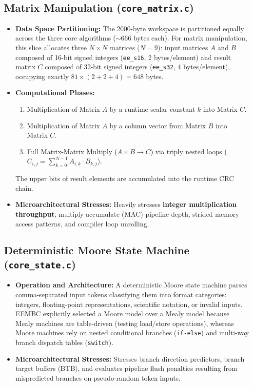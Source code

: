 \documentclass[11pt,a4paper]{article}
\begin{document}
\subsection{Matrix Manipulation (\texttt{core\_matrix.c})}
\begin{itemize}[leftmargin=1.4em]
    \item \textbf{Data Space Partitioning:}
    The 2000-byte workspace is partitioned equally across the three core algorithms (${\sim}666$ bytes each). For matrix manipulation, this slice allocates three $N\times N$ matrices ($N=9$): input matrices $A$ and $B$ composed of 16-bit signed integers (\texttt{ee\_s16}, 2 bytes/element) and result matrix $C$ composed of 32-bit signed integers (\texttt{ee\_s32}, 4 bytes/element), occupying exactly $81 \times (2 + 2 + 4) = 648$ bytes.
    \item \textbf{Computational Phases:}
    \begin{enumerate}
        \item Multiplication of Matrix $A$ by a runtime scalar constant $k$ into Matrix $C$.
        \item Multiplication of Matrix $A$ by a column vector from Matrix $B$ into Matrix $C$.
        \item Full Matrix-Matrix Multiply ($A \times B \to C$) via triply nested loops ($C_{i,j} = \sum_{k=0}^{N-1} A_{i,k} \cdot B_{k,j}$).
    \end{enumerate}
    The upper bits of result elements are accumulated into the runtime CRC chain.
    \item \textbf{Microarchitectural Stresses:}
    Heavily stresses \textbf{integer multiplication throughput}, multiply-accumulate (MAC) pipeline depth, strided memory access patterns, and compiler loop unrolling.
\end{itemize}

\clearpage
\subsection{Deterministic Moore State Machine (\texttt{core\_state.c})}
\begin{itemize}[leftmargin=1.4em]
    \item \textbf{Operation and Architecture:}
    A deterministic Moore state machine parses comma-separated input tokens classifying them into format categories: integers, floating-point representations, scientific notation, or invalid inputs. EEMBC explicitly selected a Moore model over a Mealy model because Mealy machines are table-driven (testing load/store operations), whereas Moore machines rely on nested conditional branches (\texttt{if-else}) and multi-way branch dispatch tables (\texttt{switch}).
    \item \textbf{Microarchitectural Stresses:}
    Stresses branch direction predictors, branch target buffers (BTB), and evaluates pipeline flush penalties resulting from mispredicted branches on pseudo-random token inputs.
\end{itemize}
\end{document}
